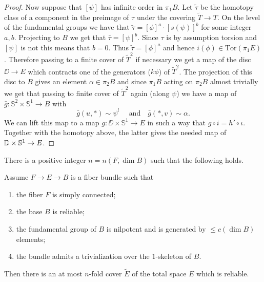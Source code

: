 \documentclass{amsart}
\begin{document}
\begin{proof}
Now suppose that $[\psi]$ has infinite order in $\pi_1B$. 
Let $\tilde\tau$ be the homotopy class of a component in the preimage of $\tau$ under the covering $\tilde T\to T$. 
On the level of  the fundamental groups we have that $\tilde\tau=[\phi]^a{\cdot} [s(\psi)]^b$ for some integer $a,b$. Projecting to $B$ we get that $\bar\tau=[\psi]^b$. Since $\tau$ is by assumption torsion and $[\psi]$ is not this means that $b=0$. Thus $\tilde\tau=[\phi]^a$ and hence
$i(\phi)\in \mathrm{Tor}(\pi_1E)$. 
Therefore passing to a finite cover of $\tilde T^2$ 
if necessary we get a map of the 
disc $\DD\to E$ which contracts one of the generators ($k \phi$) of $\tilde T^2$.
The projection of this disc to $B$ gives an element $\alpha\in \pi_2B$ 
and since $\pi_1B$ acting on $\pi_2B$ almost trivially we get 
that passing to finite cover of $\tilde T^2$ again (along $\psi$) we have a map of $\bar g\colon \mathbb{S}^2\times \mathbb{S}^1\to B$ with
$$ 
 \bar g(u,*)\sim\psi^l\quad\text{ and}\quad
 \bar g(*,v)\sim\alpha.$$
We can lift this map to a map $g\colon \DD\times \mathbb{S}^1\to E$ in such a way that $g\circ i=h'\circ \iota$. 
Together with the homotopy above, the latter gives the needed map of 
$\DD\times \mathbb{S}^1\z\to E$.
\end{proof}

\begin{claim} 
There is a positive integer $n=n(F,\dim B)$ such that the following holds.

Assume $F\to E\to B$ 
is a fiber bundle such that
\begin{enumerate}[(1)]
\item the fiber $F$ is simply connected;
\item the base $B$ is reliable;
\item the fundamental group of $B$ is nilpotent and is generated by $\le c(\dim B)$ elements;
\item the bundle admits a trivialization over the $1$-skeleton of $B$.
\end{enumerate}
Then there is an at most $n$-fold cover $\tilde E$ of the  total space $E$ which is reliable.
\end{claim}
\end{document}
